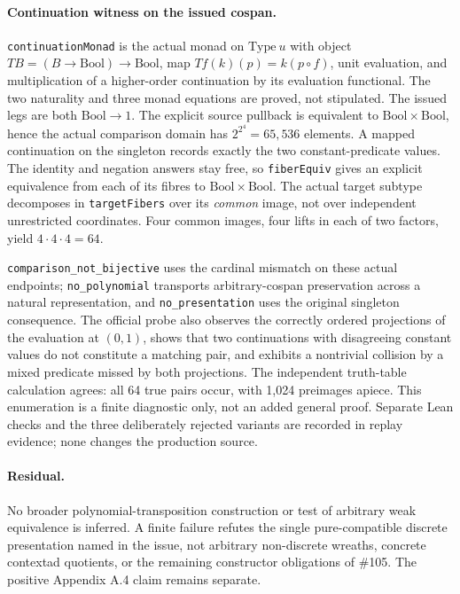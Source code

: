 \documentclass[11pt]{article}
\newcommand{\code}[1]{\texttt{#1}}
\begin{document}
\paragraph{Continuation witness on the issued cospan.}
\code{continuationMonad} is the actual monad on \(\mathrm{Type}\ u\) with object \(T B=(B\to\mathrm{Bool})\to\mathrm{Bool}\), map \(T f(k)(p)=k(p\circ f)\), unit evaluation, and multiplication of a higher-order continuation by its evaluation functional. The two naturality and three monad equations are proved, not stipulated. The issued legs are both \(\mathrm{Bool}\to 1\). The explicit source pullback is equivalent to \(\mathrm{Bool}\times\mathrm{Bool}\), hence the actual comparison domain has \(2^{2^4}=65{,}536\) elements. A mapped continuation on the singleton records exactly the two constant-predicate values. The identity and negation answers stay free, so \code{fiberEquiv} gives an explicit equivalence from each of its fibres to \(\mathrm{Bool}\times\mathrm{Bool}\). The actual target subtype decomposes in \code{targetFibers} over its \emph{common} image, not over independent unrestricted coordinates. Four common images, four lifts in each of two factors, yield \(4\cdot4\cdot4=64\).

\code{comparison\_not\_bijective} uses the cardinal mismatch on these actual endpoints; \code{no\_polynomial} transports arbitrary-cospan preservation across a natural representation, and \code{no\_presentation} uses the original singleton consequence. The official probe also observes the correctly ordered projections of the evaluation at \((0,1)\), shows that two continuations with disagreeing constant values do not constitute a matching pair, and exhibits a nontrivial collision by a mixed predicate missed by both projections. The independent truth-table calculation agrees: all 64 true pairs occur, with 1,024 preimages apiece. This enumeration is a finite diagnostic only, not an added general proof. Separate Lean checks and the three deliberately rejected variants are recorded in replay evidence; none changes the production source.

\paragraph{Residual.}
No broader polynomial-transposition construction or test of arbitrary weak equivalence is inferred. A finite failure refutes the single pure-compatible discrete presentation named in the issue, not arbitrary non-discrete wreaths, concrete contextad quotients, or the remaining constructor obligations of \#105. The positive Appendix A.4 claim remains separate.
\end{document}
